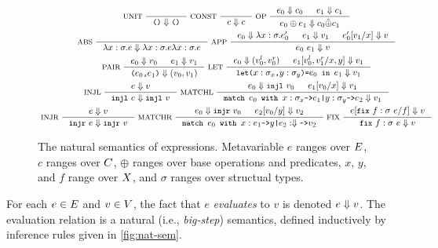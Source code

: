 \begin{figure}
  \centering
  \begin{gather*}
  \inference[ UNIT ]{ }{ \unit \evalsto \unit } 
  \inference[ CONST ]{ }{ c \evalsto c } 
  \inference[ OP ]{ %
    e_0 \evalsto c_0 & %
    e_1 \evalsto c_1 }{ %
    e_0 \oplus e_1 \evalsto c_0 \interp{\oplus} c_1 } \\
  \inference[ ABS ]{ }{ \abs{ x }{ \sigma }{ e } \evalsto %
    \abs{ x }{ \sigma }{ e } \abs{x}{\sigma}{e} } 
  \inference[ APP ]{ %
    e_0 \evalsto \abs{x}{\sigma}{e_0'} & %
    e_1 \evalsto v_1 &
    \replace{ e_0' }{ x }{ v_1 } \evalsto v }{ %
    e_0\ e_1 \evalsto v } \\
  \inference[ PAIR ]{ %
    e_0 \evalsto v_0 & e_1 \evalsto v_1 }{ %
    \pair{ e_0 }{ e_1 } \evalsto (v_0, v_1) } 
  \inference[ LET ]{
    e_0 \evalsto (v_0^l, v_0^r) &
    \replace{ e_1 }{ x, y }{ v_0^l, v_1^r } \evalsto v_1 }{ %
    \letexp{x}{\sigma_x}{y}{\sigma_y}{e_0}{e_1} \evalsto v_1 } \\
  \inference[ INJL ]{ e \evalsto v }{ %
    \injl\ e \evalsto \injl\ v } 
  \inference[ MATCHL ]{
    e_0 \evalsto \injl\ v_0 & %
    \replace{ e_1 }{ x }{ v_0 } \evalsto v_1 }{ %
    \matchexp{ e_0 }{ x }{\sigma_x}{ e_1 }{ y }{\sigma_y}{ e_2 } \evalsto v_1 } \\
  \inference[ INJR ]{ e \evalsto v }{ \injr\ e \evalsto \injr\ v }
  \inference[ MATCHR ]{
    e_0 \evalsto \injr\ v_0 &
    \replace{ e_2 }{ y }{ v_0 } \evalsto v_2 }{ %
    \matchexp{ e_0 }{ x }{ e_1 }{ y }{ e_2 } \evalsto v_2 } 
  \inference[ FIX ]{ \replace{e}{ f }{ \fix{ f }{\sigma}{ e } } \evalsto v } %
  { \fix{ f }{\sigma}{ e } \evalsto v }
  \end{gather*}
  \caption{The natural semantics of expressions.
    Metavariable $e$ ranges over $E$, %
    $c$ ranges over $C$, %
    $\oplus$ ranges over base operations and predicates, %
    $x$, $y$, and $f$ range over $X$, and
    $\sigma$ ranges over structual types.}
  \label{fig:nat-sem}
\end{figure}
%
For each $e \in E$ and $v \in V$, the fact that $e$
\emph{evaluates} to $v$ is denoted $e \Downarrow v$.
% 
The evaluation relation is a natural (i.e., \emph{big-step})
semantics, defined inductively by inference rules given in
\autoref{fig:nat-sem}.


